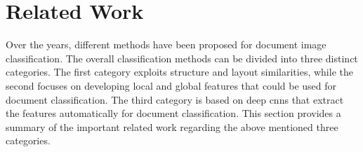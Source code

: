 \section{Related Work}


Over the years, different methods have been proposed for document image classification. The overall classification methods can be divided into three distinct categories.
The first category exploits structure and layout similarities, while the second focuses on developing local and global features that could be used for document classification. The third category is based on deep \ac{cnn}s that extract the features automatically for document classification. This section provides a summary of the important related work regarding the above mentioned three categories.

